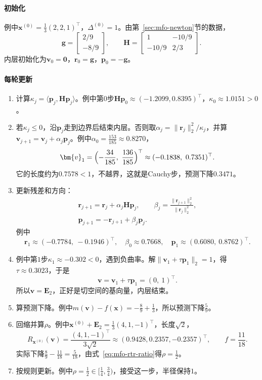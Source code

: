 \paragraph{初始化}
例中$\bm{x}^{(0)}=\tfrac13(2,2,1)^\top$，$\Delta^{(0)}=1$。由第~\ref{sec:mfo-newton}节的数据，
\[
 \bm{g}=\begin{bmatrix}2/9\\-8/9\end{bmatrix},\qquad
 \bm{H}=\begin{bmatrix}1&-10/9\\-10/9&2/3\end{bmatrix}.
\]
内层初始化为$\bm{v}_0=\bm{0}$，$\bm{r}_0=\bm{g}$，$\bm{p}_0=-\bm{g}$。

\paragraph{每轮更新}
\begin{enumerate}
 \item 计算$\kappa_j=\langle\bm{p}_j,\bm{H}\bm{p}_j\rangle$。例中第$0$步$\bm{H}\bm{p}_0\approx(-1.2099,0.8395)^\top$，$\kappa_0\approx1.0151>0$。

 \item 若$\kappa_j\leq0$，沿$\bm{p}_j$走到边界后结束内层。否则取$\alpha_j=\lVert\bm{r}_j\rVert_2^2/\kappa_j$，并算$\bm{v}_{j+1}=\bm{v}_j+\alpha_j\bm{p}_j$。例中$\alpha_0=\tfrac{153}{185}\approx0.8270$，
 \[
  \bm{v}_1=\Bigl(-\frac{34}{185},\ \frac{136}{185}\Bigr)^\top\approx(-0.1838,\ 0.7351)^\top.
 \]
 它的长度约为$0.7578<1$，不越界，这就是Cauchy步，预测下降$0.3471$。

 \item 更新残差和方向：
 \[
  \begin{gathered}
  \bm{r}_{j+1}=\bm{r}_j+\alpha_j\bm{H}\bm{p}_j,\qquad
  \beta_j=\frac{\lVert\bm{r}_{j+1}\rVert_2^2}{\lVert\bm{r}_j\rVert_2^2},\\
  \bm{p}_{j+1}=-\bm{r}_{j+1}+\beta_j\bm{p}_j.
  \end{gathered}
 \]
 例中
 \[
  \bm{r}_1\approx(-0.7784,\ -0.1946)^\top,\quad\beta_0\approx0.7668,\quad\bm{p}_1\approx(0.6080,\ 0.8762)^\top.
 \]

 \item 例中第$1$步$\kappa_1\approx-0.302<0$，遇到负曲率。解$\lVert\bm{v}_1+\tau\bm{p}_1\rVert_2=1$，得$\tau\approx0.3023$，于是
 \[
  \bm{v}=\bm{v}_1+\tau\bm{p}_1=(0,\ 1)^\top.
 \]
 所以$\bm{v}=\bm{E}_2$，正好是切空间的基向量，内层结束。

 \item 算预测下降。例中$m(\bm{v})-f(\bm{x})=-\tfrac89+\tfrac13$，所以预测下降$\tfrac59$。

 \item 回缩并算$\rho$。例中$\bm{x}^{(0)}+\bm{E}_2=\tfrac13(4,1,-1)^\top$，长度$\sqrt2$，
 \[
  R_{\bm{x}^{(0)}}(\bm{v})=\frac{(4,1,-1)^\top}{3\sqrt2}\approx(0.9428,0.2357,-0.2357)^\top,\qquad f=\frac{11}{18}.
 \]
 实际下降$\tfrac89-\tfrac{11}{18}=\tfrac{5}{18}$，由式~\eqref{eq:mfo-rtr-ratio}得$\rho=\tfrac12$。

 \item 按规则更新。例中$\rho=\tfrac12\in[\tfrac14,\tfrac34)$，接受这一步，半径保持$1$。
\end{enumerate}

